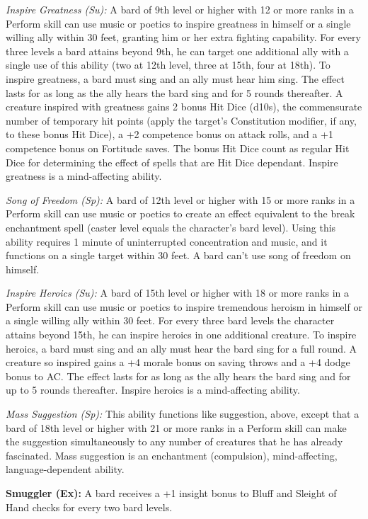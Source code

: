 \documentclass[10pt,a4paper,twocolumn]{d20}
\begin{document}
{\textit{Inspire Greatness (Su):} A bard of 9th level or higher with 12 or more ranks in a Perform skill can use music or poetics to inspire greatness in himself or a single willing ally within 30 feet, granting him or her extra fighting capability. For every three levels a bard attains beyond 9th, he can target one additional ally with a single use of this ability (two at 12th level, three at 15th, four at 18th). To inspire greatness, a bard must sing and an ally must hear him sing. The effect lasts for as long as the ally hears the bard sing and for 5 rounds thereafter. A creature inspired with greatness gains 2 bonus Hit Dice (d10s), the commensurate number of temporary hit points (apply the target’s Constitution modifier, if any, to these bonus Hit Dice), a +2 competence bonus on attack rolls, and a +1 competence bonus on Fortitude saves. The bonus Hit Dice count as regular Hit Dice for determining the effect of spells that are Hit Dice dependant. Inspire greatness is a mind-affecting ability.

\textit{Song of Freedom (Sp):} A bard of 12th level or higher with 15 or more ranks in a Perform skill can use music or poetics to create an effect equivalent to the break enchantment spell (caster level equals the character’s bard level). Using this ability requires 1 minute of uninterrupted concentration and music, and it functions on a single target within 30 feet. A bard can’t use song of freedom on himself.

\textit{Inspire Heroics (Su):} A bard of 15th level or higher with 18 or more ranks in a Perform skill can use music or poetics to inspire tremendous heroism in himself or a single willing ally within 30 feet. For every three bard levels the character attains beyond 15th, he can inspire heroics in one additional creature. To inspire heroics, a bard must sing and an ally must hear the bard sing for a full round. A creature so inspired gains a +4 morale bonus on saving throws and a +4 dodge bonus to AC. The effect lasts for as long as the ally hears the bard sing and for up to 5 rounds thereafter. Inspire heroics is a mind-affecting ability.

\textit{Mass Suggestion (Sp):} This ability functions like suggestion, above, except that a bard of 18th level or higher with 21 or more ranks in a Perform skill can make the suggestion simultaneously to any number of creatures that he has already fascinated. Mass suggestion is an enchantment (compulsion), mind-affecting, language-dependent ability.

\textbf{Smuggler (Ex):} A bard receives a +1 insight bonus to Bluff and Sleight of Hand checks for every two bard levels.

}
\end{document}
